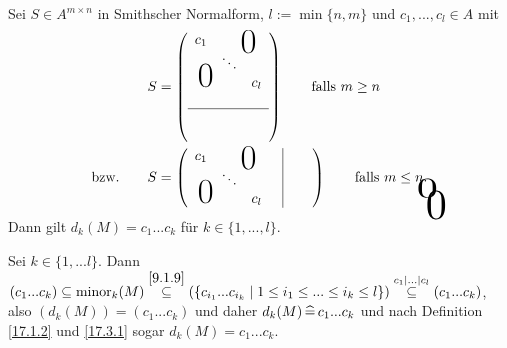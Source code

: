 \documentclass[../../main.tex]{subfiles}
\begin{document}
\begin{lem}\label{17.3.4}
Sei $S\in A^{m\times n}$ in Smithscher Normalform, $l:=\min\{n,m\}$ und $c_1,...,c_l\in A$ mit \begin{align*}
&S=\left(\begin{array}{c c c}
c_1& \multicolumn{2}{c}{\text{\kern 1em\smash{\raisebox{-1.5ex}{\Huge 0}}}} \\
& \ddots &  \\
\multicolumn{2}{c}{\text{\kern-1.5em\smash{\raisebox{0ex}{\Huge 0}}}} &c_l\\
& &\\
\hline 
&\tikz[remember picture]\node[inner sep=0pt] (a){ };&\\
& &
\end{array}\right)\qquad\text{falls }m\ge n\\
\text{bzw.}\qquad&S=\left(\begin{array}{c c c c|c c}
 c_1& \multicolumn{2}{c}{\text{\kern 1em\smash{\raisebox{-1.5ex}{\Huge 0}}}}& &\tikz[remember picture]\node[inner sep=0pt] (b){ }; &\\
& \ddots & & \\
\multicolumn{2}{c}{\text{\kern-1.5em\smash{\raisebox{0ex}{\Huge 0}}}}& c_l& &\\
\end{array}\right)\qquad\text{falls }m\le n.
\begin{tikzpicture}[overlay, remember picture]
\node at (a.north) [anchor=center,yshift=-0.2cm, yscale=2,xscale=3] {$0$};
\node at (b.east) [anchor=center, xshift=0.2cm,yshift=-0.6cm,  xscale=3, yscale=3] {$0$};
\end{tikzpicture}
\end{align*}
Dann gilt $d_k(M)=c_1...c_k$ für $k\in\{1,...,l\}$.
\end{lem}
\begin{cproof}
Sei $k\in\{1,...l\}$. Dann $(c_1...c_k)\subseteq \operatorname{minor}_k(M)\stackrel{\ref{9.1.9}}{\subseteq}(\{c_{i_1}...c_{i_k}\mid 1\le i_1\le...\le i_k\le l\})\stackrel{c_1\mid...\mid c_l}{\subseteq}(c_1...c_k)$, also $(d_k(M))=(c_1...c_k)$ und daher $d_k(M)\,\widehat{=}\, c_1...c_k$ und nach Definition \ref{17.1.2} und \ref{17.3.1} sogar $d_k(M)=c_1...c_k$.
\end{cproof}
\end{document}
